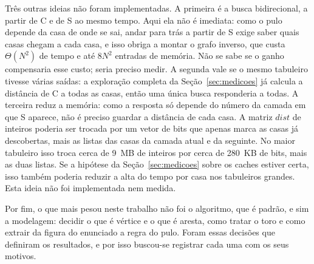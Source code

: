 Três outras ideias não foram implementadas. A primeira é a busca bidirecional, a partir de C e
de S ao mesmo tempo. Aqui ela não é imediata: como o pulo depende da casa de onde se sai,
andar para trás a partir de S exige saber quais casas chegam a cada casa, e isso obriga a montar
o grafo inverso, que custa $\Theta(N^2)$ de tempo e até $8N^2$ entradas de memória. Não se sabe
se o ganho compensaria esse custo; seria preciso medir. A segunda vale se o mesmo tabuleiro
tivesse várias saídas: a exploração completa da Seção~\ref{sec:medicoes} já calcula a distância
de C a todas as casas, então uma única busca responderia a todas. A terceira reduz a memória: como a resposta só
depende do número da camada em que S aparece, não é preciso guardar a distância de cada casa.
A matriz $dist$ de inteiros poderia ser trocada por um vetor de bits que apenas marca as casas
já descobertas, mais as listas das casas da camada atual e da seguinte. No maior tabuleiro isso
troca cerca de 9~MB de inteiros por cerca de 280~KB de bits, mais as duas listas. Se a hipótese
da Seção~\ref{sec:medicoes} sobre os caches estiver certa, isso também poderia reduzir a alta do
tempo por casa nos tabuleiros grandes. Esta ideia não foi implementada nem medida.

Por fim, o que mais pesou neste trabalho não foi o algoritmo, que é padrão, e sim a modelagem:
decidir o que é vértice e o que é aresta, como tratar o toro e como extrair da figura do
enunciado a regra do pulo. Foram essas decisões que definiram os resultados, e por isso buscou-se
registrar cada uma com os seus motivos.
